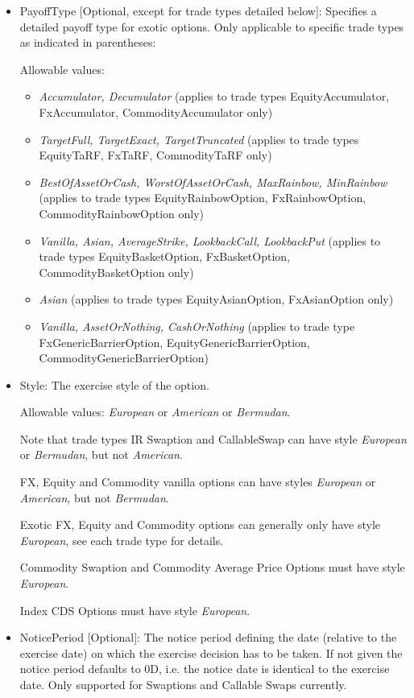 \begin{itemize}
\item PayoffType [Optional, except for trade types detailed below]: Specifies a detailed payoff type for exotic options. Only applicable to specific trade types as
  indicated in parentheses:

  Allowable values:
  \begin{itemize}
  \item \emph{Accumulator, Decumulator} (applies to trade types EquityAccumulator, FxAccumulator, CommodityAccumulator only)
  \item \emph{TargetFull, TargetExact, TargetTruncated} (applies to trade types EquityTaRF, FxTaRF, CommodityTaRF only)
  \item \emph{BestOfAssetOrCash, WorstOfAssetOrCash, MaxRainbow, MinRainbow} (applies to trade types EquityRainbowOption,
    FxRainbowOption, CommodityRainbowOption only)
  \item \emph{Vanilla, Asian, AverageStrike, LookbackCall, LookbackPut} (applies to trade types EquityBasketOption,
    FxBasketOption, CommodityBasketOption only)
  \item \emph{Asian} (applies to trade types EquityAsianOption, FxAsianOption only)
  \item \emph{Vanilla, AssetOrNothing, CashOrNothing} (applies to trade type FxGenericBarrierOption, EquityGenericBarrierOption, CommodityGenericBarrierOption)
  \end{itemize}

\item Style: The exercise style of the option. 

  Allowable values: \emph{European} or \emph{American} or \emph{Bermudan}. 
  
  Note that trade types IR Swaption and CallableSwap can have style
  \emph{European} or \emph{Bermudan}, but not \emph{American}.  
  
  FX, Equity and Commodity vanilla options can have styles \emph{European}
  or \emph{American}, but not \emph{Bermudan}. 
  
  Exotic FX, Equity and Commodity  options can generally only have style \emph{European}, see each trade type for details.
  
  Commodity Swaption and Commodity Average Price Options must have style \emph{European}. 
  
  Index CDS Options must have style  \emph{European}. 

\item NoticePeriod [Optional]: The notice period defining the date (relative to the exercise date) on which the exercise
  decision has to be taken. If not given the notice period defaults to 0D, i.e. the notice date is identical to the
  exercise date. Only supported for Swaptions and Callable Swaps currently.


\end{itemize}
